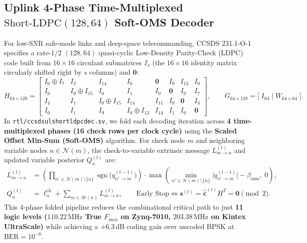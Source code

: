 \documentclass[10pt,a4paper]{article}
\renewcommand{\_}{\origunderscore\penalty0\hskip0pt\relax}
\numberwithin{equation}{section}
\numberwithin{table}{section}
\numberwithin{figure}{section}
\begin{document}
\subsection{Uplink 4-Phase Time-Multiplexed $\text{Short-LDPC}(128,64)$ Soft-OMS Decoder}
For low-SNR safe-mode links and deep-space telecommanding, CCSDS 231.1-O-1 \cite{ccsds2311} specifies a rate-$1/2$ $(128,64)$ quasi-cyclic Low-Density Parity-Check (LDPC) code built from $16 \times 16$ circulant submatrices $I_s$ (the $16\times 16$ identity matrix circularly shifted right by $s$ columns) and $\mathbf{0}$:
\begin{equation}
  H_{64 \times 128} = \begin{bmatrix}
    I_0 \oplus I_7 & I_2 & I_{14} & I_6 & \mathbf{0} & I_0 & I_{13} & I_0 \\
    I_6 & I_0 \oplus I_{15} & I_0 & I_1 & I_0 & \mathbf{0} & I_0 & I_7 \\
    I_4 & I_1 & I_0 \oplus I_{15} & I_{14} & I_{11} & I_0 & \mathbf{0} & I_3 \\
    I_0 & I_1 & I_9 & I_0 \oplus I_{13} & I_{14} & I_1 & I_0 & \mathbf{0}
  \end{bmatrix}, \qquad
  G_{64 \times 128} = \big[\; I_{64} \;\big|\; W_{64 \times 64} \;\big].
\end{equation}
In \texttt{rtl/ccsds\_ul\_short\_ldpc\_dec.sv}, we fold each decoding iteration across \textbf{4 time-multiplexed phases (16 check rows per clock cycle)} using the \textbf{Scaled Offset Min-Sum (Soft-OMS)} algorithm. For check node $m$ and neighboring variable nodes $n \in \mathcal{N}(m)$, the check-to-variable extrinsic message $L_{m \to n}^{(t)}$ and updated variable posterior $Q_n^{(t)}$ are:
\begin{align}
  L_{m \to n}^{(t)} &= \left(\prod_{n' \in \mathcal{N}(m)\setminus\{n\}} \operatorname{sgn}\!\big(q_{n' \to m}^{(t-1)}\big)\right) \cdot \max\!\left(\min_{n' \in \mathcal{N}(m)\setminus\{n\}} \big|q_{n' \to m}^{(t-1)}\big| - \beta_{\text{oms}},\; 0\right), \\
  Q_n^{(t)} &= \ell_n^{\text{ch}} + \sum_{m \in \mathcal{M}(n)} L_{m \to n}^{(t)}, \qquad \text{Early Stop} \iff \mathbf{s}^{(t)} = \hat{\mathbf{c}}^{(t)} H^T = \mathbf{0} \pmod 2.
\end{align}
This 4-phase folded pipeline reduces the combinational critical path to just \textbf{11 logic levels ($110.22\,\text{MHz}$ True $F_{\max}$ on Zynq-7010, $203.38\,\text{MHz}$ on Kintex UltraScale)} while achieving a $+6.3\,\text{dB}$ coding gain over uncoded BPSK at $\text{BER} = 10^{-6}$.
\end{document}
